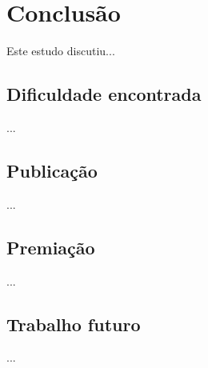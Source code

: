 
\clearpage
\section{Conclusão}\label{sec:conclusion}

Este estudo discutiu...

\subsection{Dificuldade encontrada}

...

\subsection{Publicação}
...

\subsection{Premiação}

...

\subsection{Trabalho futuro}

...

